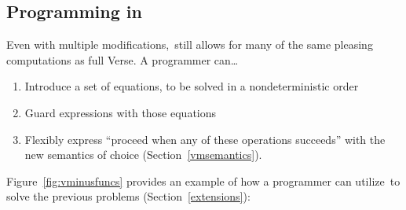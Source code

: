 \documentclass[manuscript,screen 12pt, nonacm]{acmart}
\begin{document}
    \subsection{Programming in~\VMinus}

    Even with multiple modifications,~\VMinus still allows for many of the same
    pleasing computations as full Verse. A programmer can\dots
        \begin{enumerate}
            \item Introduce a set of equations, to be solved in a
            nondeterministic order 
            \item Guard expressions with those equations 
            \item Flexibly express “proceed when any of these operations
            succeeds” with the new semantics of choice
            (Section~\ref{vmsemantics}). 
        \end{enumerate}

    Figure~\ref{fig:vminusfuncs} provides an example of how a programmer can
    utilize~\VMinus to solve the previous problems (Section~\ref{extensions}): 
    
\end{document}
